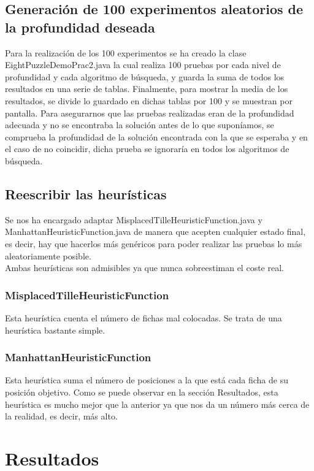 \documentclass[a4paper]{article}
\begin{document}
\subsection{Generación de 100 experimentos aleatorios de la profundidad deseada}
Para la realización de los 100 experimentos se ha creado la clase EightPuzzleDemoPrac2.java la cual realiza 100 pruebas por cada nivel de profundidad y cada algoritmo de búsqueda, y guarda la suma de todos los resultados en una serie de tablas. Finalmente, para mostrar la media de los resultados, se divide lo guardado en dichas tablas por 100 y se muestran por pantalla.
Para asegurarnos que las pruebas realizadas eran de la profundidad adecuada y no se encontraba la solución antes de lo que suponíamos, se comprueba la profundidad de la solución encontrada  con la que se esperaba y en el caso de no coincidir, dicha prueba se ignoraría en todos los algoritmos de búsqueda.

\subsection{Reescribir las heurísticas}
Se nos ha encargado adaptar MisplacedTilleHeuristicFunction.java y ManhattanHeuristicFunction.java de manera que acepten cualquier estado final, es decir, hay que hacerlos más genéricos para poder realizar las pruebas lo más aleatoriamente posible. \\
Ambas heurísticas son admisibles ya que nunca sobreestiman el coste real.

\subsubsection{MisplacedTilleHeuristicFunction}
Esta heurística cuenta el número de fichas mal colocadas. Se trata de una heurística bastante simple.

\subsubsection{ManhattanHeuristicFunction}
Esta heurística suma el número de posiciones a la que está cada ficha de su posición objetivo. Como se puede observar en la sección Resultados, esta heurística es mucho mejor que la anterior ya que nos da un número más cerca de la realidad, es decir, más alto.

\section{Resultados}
\end{document}
